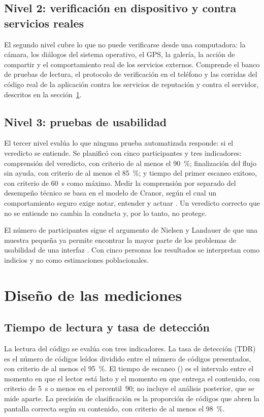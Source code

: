 \subsection{Nivel 2: verificación en dispositivo y contra servicios reales}

El segundo nivel cubre lo que no puede verificarse desde una computadora: la cámara, los diálogos del sistema operativo, el GPS, la galería, la acción de compartir y el comportamiento real de los servicios externos. Comprende el banco de pruebas de lectura, el protocolo de verificación en el teléfono y las corridas del código real de la aplicación contra los servicios de reputación y contra el servidor, descritos en la sección~\ref{sec:mediciones}.

\subsection{Nivel 3: pruebas de usabilidad}

El tercer nivel evalúa lo que ninguna prueba automatizada responde: si el veredicto se entiende. Se planificó con cinco participantes y tres indicadores: comprensión del veredicto, con criterio de al menos el 90~\%; finalización del flujo sin ayuda, con criterio de al menos el 85~\%; y tiempo del primer escaneo exitoso, con criterio de 60~s como máximo. Medir la comprensión por separado del desempeño técnico se basa en el modelo de Cranor, según el cual un comportamiento seguro exige notar, entender y actuar \cite{cranor2008framework}. Un veredicto correcto que no se entiende no cambia la conducta y, por lo tanto, no protege.

El número de participantes sigue el argumento de Nielsen y Landauer de que una muestra pequeña ya permite encontrar la mayor parte de los problemas de usabilidad de una interfaz \cite{nielsen1993mathematical}. Con cinco personas los resultados se interpretan como indicios y no como estimaciones poblacionales.

\section{Diseño de las mediciones}
\label{sec:mediciones}

\subsection{Tiempo de lectura y tasa de detección}

La lectura del código se evalúa con tres indicadores. La tasa de detección (TDR) es el número de códigos leídos dividido entre el número de códigos presentados, con criterio de al menos el 95~\%. El tiempo de escaneo (\tscan) es el intervalo entre el momento en que el lector está listo y el momento en que entrega el contenido, con criterio de 5~s o menos en el percentil~90; no incluye el análisis posterior, que se mide aparte. La precisión de clasificación es la proporción de códigos que abren la pantalla correcta según su contenido, con criterio de al menos el 98~\%.

